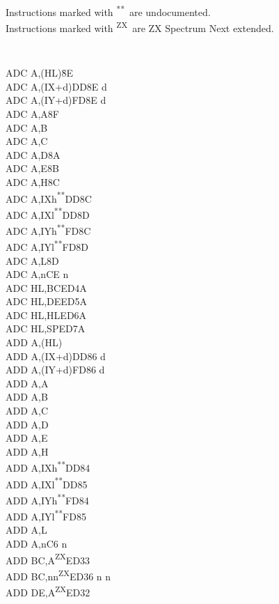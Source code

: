 \documentclass[12pt,twoside,openright,a4paper]{book}
\newcommand{\UNDOC}{\textnormal{\textsuperscript{**}}}
\newcommand{\ZXN}{\textnormal{\textsuperscript{ZX}}}
\begin{document}
Instructions marked with \UNDOC ~are undocumented.\\
Instructions marked with \ZXN ~are ZX Spectrum Next extended.
\setlength\columnsep{4em}
\begin{multicols}{3}
{
	\tt 
	\footnotesize
	\begin{tabbing}
	ADC A,(HL){\qquad}{\quad}\=8E\\
	ADC A,(IX+d)\>DD8E d\\
	ADC A,(IY+d)\>FD8E d\\
	ADC A,A\>8F\\
	ADC A,B\\
	ADC A,C\\
	ADC A,D\>8A\\
	ADC A,E\>8B\\
	ADC A,H\>8C\\
	ADC A,IXh\UNDOC\>DD8C\\
	ADC A,IXl\UNDOC\>DD8D\\
	ADC A,IYh\UNDOC\>FD8C\\
	ADC A,IYl\UNDOC\>FD8D\\
	ADC A,L\>8D\\
	ADC A,n\>CE n\\
	ADC HL,BC\>ED4A\\
	ADC HL,DE\>ED5A\\
	ADC HL,HL\>ED6A\\
	ADC HL,SP\>ED7A\\
	ADD A,(HL)\\
	ADD A,(IX+d)\>DD86 d\\
	ADD A,(IY+d)\>FD86 d\\
	ADD A,A\\
	ADD A,B\\
	ADD A,C\\
	ADD A,D\\
	ADD A,E\\
	ADD A,H\\
	ADD A,IXh\UNDOC\>DD84\\
	ADD A,IXl\UNDOC\>DD85\\
	ADD A,IYh\UNDOC\>FD84\\
	ADD A,IYl\UNDOC\>FD85\\
	ADD A,L\\
	ADD A,n\>C6 n\\
	ADD BC,A\ZXN\>ED33\\
	ADD BC,nn\ZXN\>ED36	n n\\
	ADD DE,A\ZXN\>ED32\\

\end{tabbing}}
\end{multicols}
\end{document}
